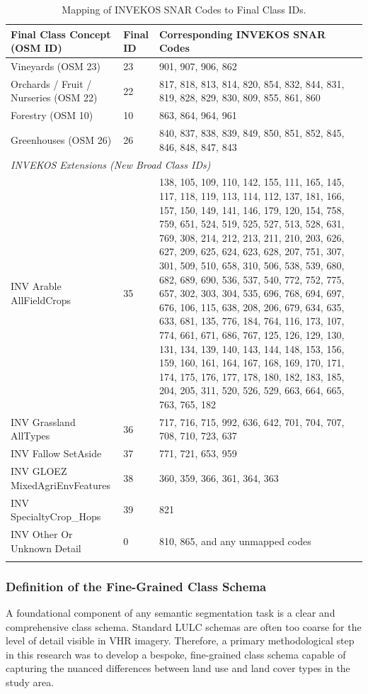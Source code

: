 \documentclass{report}
\begin{document}
\begin{longtable}{@{}p{} p{} p{}@{}}
\caption{Mapping of INVEKOS SNAR Codes to Final Class IDs.}\\
\toprule
\textbf{Final Class Concept (OSM ID)} & \textbf{Final ID} & \textbf{Corresponding INVEKOS SNAR Codes} \\
\midrule
\endhead

Vineyards (OSM 23) & 23 & 901, 907, 906, 862 \\
\hline
Orchards / Fruit / Nurseries (OSM 22) & 22 & 817, 818, 813, 814, 820, 854, 832, 844, 831, 819, 828, 829, 830, 809, 855, 861, 860 \\
\hline
Forestry (OSM 10) & 10 & 863, 864, 964, 961 \\
\hline
Greenhouses (OSM 26) & 26 & 840, 837, 838, 839, 849, 850, 851, 852, 845, 846, 848, 847, 843 \\
\midrule
\multicolumn{3}{l}{\textit{INVEKOS Extensions (New Broad Class IDs)}} \\
\midrule
INV Arable AllFieldCrops & 35 & 138, 105, 109, 110, 142, 155, 111, 165, 145, 117, 118, 119, 113, 114, 112, 137, 181, 166, 157, 150, 149, 141, 146, 179, 120, 154, 758, 759, 651, 524, 519, 525, 527, 513, 528, 631, 769, 308, 214, 212, 213, 211, 210, 203, 626, 627, 209, 625, 624, 623, 628, 207, 751, 307, 301, 509, 510, 658, 310, 506, 538, 539, 680, 682, 689, 690, 536, 537, 540, 772, 752, 775, 657, 302, 303, 304, 535, 696, 768, 694, 697, 676, 106, 115, 638, 208, 206, 679, 634, 635, 633, 681, 135, 776, 184, 764, 116, 173, 107, 774, 661, 671, 686, 767, 125, 126, 129, 130, 131, 134, 139, 140, 143, 144, 148, 153, 156, 159, 160, 161, 164, 167, 168, 169, 170, 171, 174, 175, 176, 177, 178, 180, 182, 183, 185, 204, 205, 311, 520, 526, 529, 663, 664, 665, 763, 765, 182 \\
\hline
INV Grassland AllTypes & 36 & 717, 716, 715, 992, 636, 642, 701, 704, 707, 708, 710, 723, 637 \\
\hline
INV Fallow SetAside & 37 & 771, 721, 653, 959 \\
\hline
INV GLOEZ MixedAgriEnvFeatures & 38 & 360, 359, 366, 361, 364, 363 \\
\hline
INV SpecialtyCrop\_Hops & 39 & 821 \\
\hline
INV Other Or Unknown Detail & 0 & 810, 865, and any unmapped codes \\
\bottomrule
\label{tab:invekos_mapping} 
\end{longtable}


\subsubsection{Definition of the Fine-Grained Class Schema}
\label{sec:def_class_schema}
A foundational component of any semantic segmentation task is a clear and comprehensive class schema. Standard LULC schemas are often too coarse for the level of detail visible in VHR imagery. Therefore, a primary methodological step in this research was to develop a bespoke, fine-grained class schema capable of capturing the nuanced differences between land use and land cover types in the study area.
\end{document}
